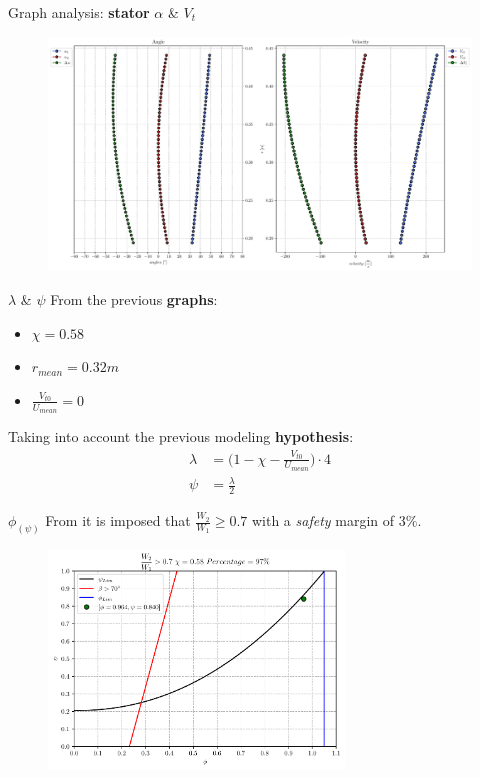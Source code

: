 {	\begin{frame}{Graph analysis: \textbf{stator} $\alpha$ \& $V_{t}$}
		\begin{figure}
			\centering
			\includegraphics[width=\textwidth]{figures/alphaAngles.pdf}
		\end{figure}
	\end{frame}
	}

	\begin{frame}{$\lambda$ \& $\psi$}
		From the previous \textbf{graphs}:
		\begin{itemize}
			\item $\chi = 0.58$
			\item $r_{mean} = 0.32 m$
			\item $\frac{V_{t0}}{U_{mean}} = 0$
		\end{itemize}
		Taking into account the previous modeling \textbf{hypothesis}:
		\begin{align}
			\lambda & = \Bigg( 1 - \chi - \frac{V_{t0}}{U_{mean}} \Bigg) \cdot 4 \nonumber \\
			\psi    & = \frac{\lambda}{2} \nonumber
		\end{align}
	\end{frame}
	
	\begin{frame}{$\phi_{(\psi)}$}
		From \cite[Sec. 10.4]{axial2004} it is imposed that $\frac{W_2}{W_1} \geq 0.7$ with a \textit{safety} margin of $3 \%$.  
		\begin{figure}
			\centering
			\includegraphics[width=0.7\textwidth]{figures/stagePerf.pdf}
		\end{figure}
	\end{frame}


